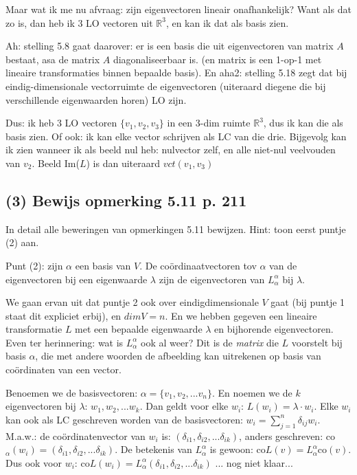 \documentclass{article}
\begin{document}
Maar wat ik me nu afvraag: zijn eigenvectoren lineair onafhankelijk? Want als dat zo is, dan heb ik 3 LO vectoren uit $\mathbb{R}^3$, en kan ik dat als basis zien. 

Ah: stelling 5.8 gaat daarover: er is een basis die uit eigenvectoren van matrix $A$ bestaat, asa de matrix $A$ diagonaliseerbaar is. (en matrix is een 1-op-1 met lineaire transformaties binnen bepaalde basis). En aha2: stelling 5.18 zegt dat bij eindig-dimensionale vectorruimte de eigenvectoren (uiteraard diegene die bij verschillende eigenwaarden horen) LO zijn. 

Dus: ik heb 3 LO vectoren $\{ v_1, v_2, v_3 \}$ in een 3-dim ruimte $\mathbb{R}^3$, dus ik kan die als basis zien. Of ook: ik kan elke vector schrijven als LC van die drie. 
Bijgevolg kan ik zien wanneer ik als beeld nul heb: nulvector zelf, en alle niet-nul veelvouden van $v_2$. Beeld Im($L$) is dan uiteraard $vct(v_1, v_3)$

\subsection*{(3) Bewijs opmerking 5.11 p. 211}

In detail alle beweringen van opmerkingen 5.11 bewijzen. 
Hint: toon eerst puntje (2) aan.

Punt (2): zijn $\alpha$ een basis van $V$. De co\"ordinaatvectoren tov $\alpha$ van de eigenvectoren bij een eigenwaarde $\lambda$ zijn de eigenvectoren van $L_{\alpha}^{\alpha}$ bij $\lambda$.

We gaan ervan uit dat puntje 2 ook over eindigdimensionale $V$ gaat (bij puntje 1 staat dit expliciet erbij), en $dim V=n$. En we hebben gegeven een lineaire transformatie $L$ met een bepaalde eigenwaarde $\lambda$ en bijhorende eigenvectoren. 
Even ter herinnering: wat is $L_{\alpha}^{\alpha}$ ook al weer? Dit is de \emph{matrix} die $L$ voorstelt bij basis $\alpha$, die met andere woorden de afbeelding kan uitrekenen op basis van co\"ordinaten van een vector. 

Benoemen we de basisvectoren: $\alpha=\{ v_1, v_2, ... v_n  \}$.
En noemen we de $k$ eigenvectoren bij $\lambda$: $w_1, w_2, ... w_k $. 
Dan geldt voor elke $w_i$: $L(w_i)=\lambda \cdot w_i$. 
Elke $w_i$ kan ook als LC geschreven worden van de basisvectoren: 
$w_i = \sum_{j=1}^{n} \delta_{ij} w_i$. M.a.w.: de co\"ordinatenvector van $w_i$ is: $(\delta_{i1}, \delta_{i2}, ... \delta_{ik})$, anders geschreven: co$_{\alpha}(w_i)=(\delta_{i1}, \delta_{i2}, ... \delta_{ik})$. 
De betekenis van $L_{\alpha}^{\alpha}$ is gewoon: co$L(v) 
 = L_{\alpha}^{\alpha}$co$(v)$. 
Dus ook voor $w_i$:   co$L(w_i)= L_{\alpha}^{\alpha} (\delta_{i1}, \delta_{i2}, ... \delta_{ik})$
... nog niet klaar...
\end{document}
